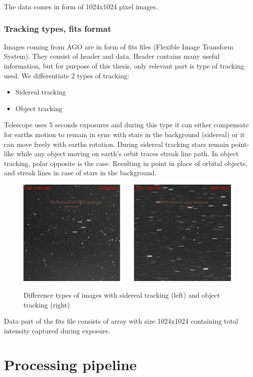\documentclass[12pt, a4paper, oneside]{book}
\begin{document}
The data comes in form of 1024x1024 pixel images.

\subsection{Tracking types, fits format}
Images coming from AGO are in form of fits files (Flexible Image Transform System).
They consist of header and data.
Header contains many useful information, but for purpose of this thesis, only relevant part is type of tracking used.
We differentiate 2 types of tracking:
\begin{itemize}
    \item{Sidereal tracking}
    \item{Object tracking}
\end{itemize}

Telescope uses 5 seconds exposures and during this type it can either compensate for earths motion to remain in sync with stars in the background (sidereal) or it can move freely with earths rotation.
During sidereal tracking stars remain point-like while any object moving on earth's orbit traces streak line path.
In object tracking, polar opposite is the case.
Resulting in point in place of orbital objects, and streak lines in case of stars in the background.

\begin{figure}[!hbt]
    \begin{center}
        \includegraphics[scale=0.60]{images/tracking.png}
        \label{img:tracking types}
        \caption{Difference types of images with sidereal tracking (left) and object tracking (right)}
    \end{center}
\end{figure}

Data part of the fits file consists of array with size 1024x1024 containing total intensity captured during exposure.

\chapter{Processing pipeline}
\end{document}
